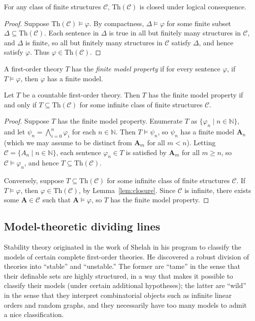 \documentclass{lmcs}
\newcommand{\Th}{\mathrm{Th}}
\newcommand{\A}{\mathbf{A}}
\theoremstyle{thmC}
\begin{document}
\begin{lem}\label{lem:closure}
For any class of finite structures $\mathcal{C}$, $\Th(\mathcal{C})$ is closed under logical consequence. 
\end{lem}
\begin{proof}
Suppose $\Th(\mathcal{C})\models \varphi$. By compactness,  $\Delta\models \varphi$ for some finite subset $\Delta\subseteq \Th(\mathcal{C})$. Each sentence in $\Delta$ is true in all but finitely many structures in $\mathcal{C}$, and $\Delta$ is finite, so all but finitely many structures in $\mathcal{C}$ satisfy $\Delta$, and hence satisfy $\varphi$. Thus $\varphi\in \Th(\mathcal{C})$. 
\end{proof}

\begin{defi}
A first-order theory $T$ has the \emph{finite model property} if for every sentence $\varphi$, if $T\models \varphi$, then $\varphi$ has a finite model.
\end{defi}

\begin{lem}\label{lem:fmp}
Let $T$ be a countable first-order theory. Then $T$ has the finite model property if and only if $T \subseteq \Th(\mathcal{C})$ for some infinite class of finite structures $\mathcal{C}$.
\end{lem}
\begin{proof}
Suppose $T$ has the finite model property. Enumerate $T$ as $\{\varphi_n\mid n\in \mathbb{N}\}$, and let $\psi_n = \bigwedge_{i=0}^n \varphi_i$ for each $n\in \mathbb{N}$. Then $T\models \psi_n$, so $\psi_n$ has a finite model $\A_n$ (which we may assume to be distinct from $\A_m$ for all $m<n$). Letting $\mathcal{C} = \{A_n\mid n\in \mathbb{N}\}$, each sentence $\varphi_n\in T$ is satisfied by $\A_m$ for all $m\geq n$, so $\mathcal{C}\models \varphi_n$, and hence $T\subseteq \Th(\mathcal{C})$.

Conversely, suppose $T\subseteq \Th(\mathcal{C})$ for some infinite class of finite structures $\mathcal{C}$. If $T\models \varphi$, then $\varphi\in \Th(\mathcal{C})$, by Lemma~\ref{lem:closure}. Since $\mathcal{C}$ is infinite, there exists some $\A\in \mathcal{C}$ such that $\A\models \varphi$, so $T$ has the finite model property. 
\end{proof}

\subsection{Model-theoretic dividing lines}\label{sec:dividinglines}
Stability theory originated in the work of Shelah in his program to classify the models of certain complete first-order theories. He discovered a robust division of theories into ``stable'' and ``unstable.'' The former are ``tame'' in the sense that their definable sets are highly structured, in a way that makes it possible to classify their models (under certain additional hypotheses); the latter are ``wild'' in the sense that they interpret combinatorial objects such as infinite linear orders and random graphs, and they necessarily have too many models to admit a nice classification.
\end{document}

